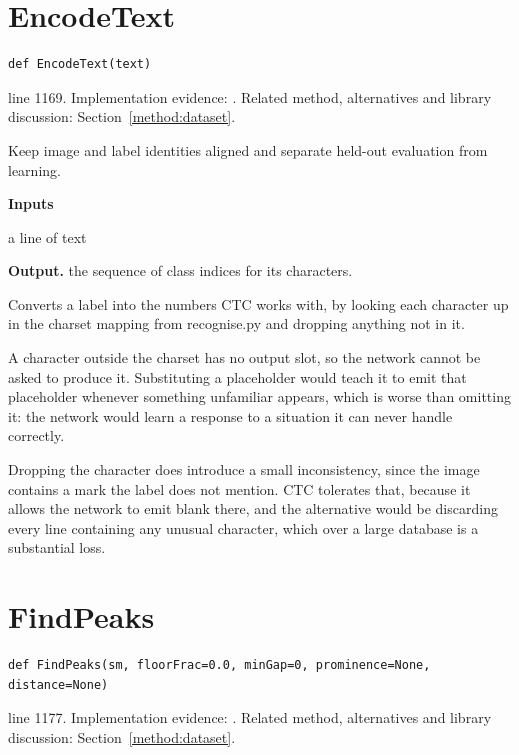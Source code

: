 \section{EncodeText}\label{fn:train:EncodeText}
\begin{lstlisting}[style=sig]
def EncodeText(text)
\end{lstlisting}
 line 1169. Implementation evidence: \cite{code2026}. Related method, alternatives and library discussion: Section~\ref{method:dataset}.


Keep image and label identities aligned and separate held-out evaluation from learning.




\noindent\textbf{Inputs}
\begin{description}[leftmargin=2.2em,style=nextline,font=\normalfont\ttfamily]\setlength\itemsep{1pt}
  \item[{text}] \normalfont a line of text
\end{description}

\noindent\textbf{Output.} the sequence of class indices for its characters.


Converts a label into the numbers CTC works with, by looking each character up in the charset mapping from recognise.py and dropping anything not in it.


A character outside the charset has no output slot, so the network cannot be asked to produce it. Substituting a placeholder would teach it to emit that placeholder whenever something unfamiliar appears, which is worse than omitting it: the network would learn a response to a situation it can never handle correctly.

Dropping the character does introduce a small inconsistency, since the image contains a mark the label does not mention. CTC tolerates that, because it allows the network to emit blank there, and the alternative would be discarding every line containing any unusual character, which over a large database is a substantial loss.



\section{FindPeaks}\label{fn:train:FindPeaks}
\begin{lstlisting}[style=sig]
def FindPeaks(sm, floorFrac=0.0, minGap=0, prominence=None, distance=None)
\end{lstlisting}
 line 1177. Implementation evidence: \cite{code2026}. Related method, alternatives and library discussion: Section~\ref{method:dataset}.



